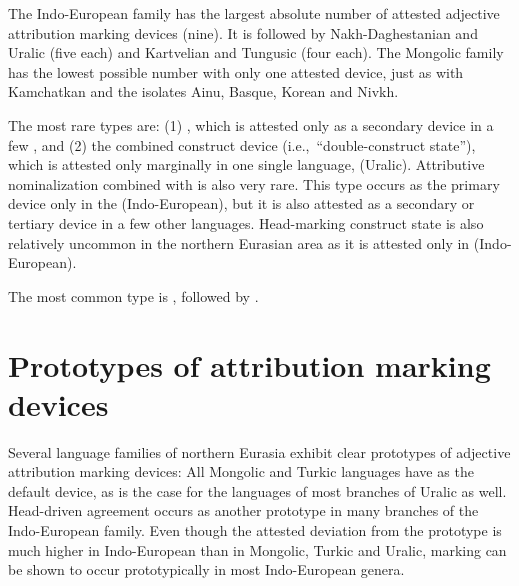 The Indo-European family has the largest absolute number of attested adjective attribution marking devices (nine). It is followed by Nakh-Daghestanian and Uralic (five each) and Kartvelian and Tungusic (four each). The Mongolic family has the lowest possible number with only one attested device, just as with Kamchatkan and the isolates Ainu, Basque, Korean and Nivkh.

The most rare types are: (1) , which is attested only as a secondary device in a few , and (2) the combined construct device (i.e.,~“double\hyp{}construct state”), which is attested only marginally in one single language,  (Uralic). Attributive nominalization combined  with  is also very rare. This type occurs as the primary device only in the  (Indo-European), but it is also attested as a secondary or tertiary device in a few other languages. Head-marking construct state is also relatively uncommon in the northern Eurasian area as it is attested only in  (Indo-European).

The most common type is , followed by .

\section{Prototypes of attribution marking devices}
Several language families of northern Eurasia exhibit clear prototypes of adjective attribution marking devices: All Mongolic and Turkic languages have  as the default device, as is the case for the languages of most branches of Uralic as well. Head\hyp{}driven agreement occurs as another prototype in many branches of the Indo-European family. Even though the attested deviation from the prototype is much higher in Indo-European than in Mongolic, Turkic and Uralic,  marking can be shown to occur prototypically in most Indo-European genera.

